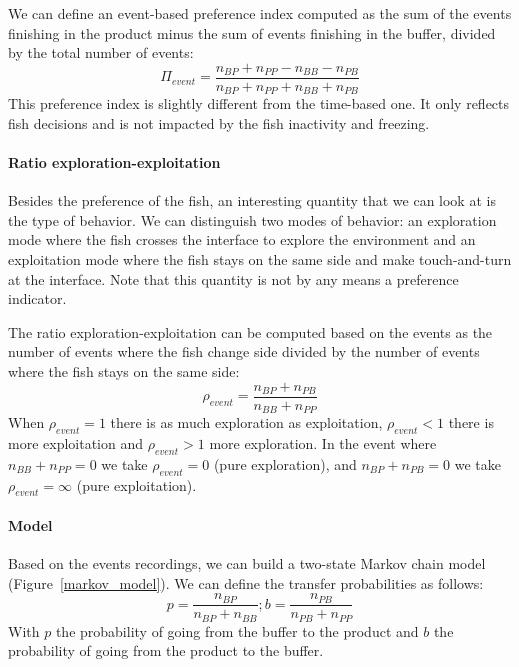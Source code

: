  We can define an event-based preference index computed as the sum of the events finishing in the product minus the sum of events finishing in the buffer, divided by the total number of events:
  \begin{equation}
    \Pi_{event} = \frac{n_{BP} + n_{PP} - n_{BB} - n_{PB}}{n_{BP} + n_{PP} + n_{BB} + n_{PB}}
  \end{equation}
  \noindent This preference index is slightly different from the time-based one. It only reflects fish decisions and is not impacted by the fish inactivity and freezing.

  \paragraph{Ratio exploration-exploitation} Besides the preference of the fish, an interesting quantity that we can look at is the type of behavior. We can distinguish two modes of behavior: an exploration mode where the fish crosses the interface to explore the environment and an exploitation mode where the fish stays on the same side and make touch-and-turn at the interface. Note that this quantity is not by any means a preference indicator.

  The ratio exploration-exploitation can be computed based on the events as the number of events where the fish change side divided by the number of events where the fish stays on the same side:
  \begin{equation}
    \rho_{event} = \frac{n_{BP} + n_{PB}}{n_{BB} + n_{PP}}
  \end{equation}
\noindent When $\rho_{event} = 1$ there is as much exploration as exploitation, $\rho_{event} < 1$ there is more exploitation and $\rho_{event} > 1$ more exploration. In the event where $n_{BB} + n_{PP} = 0$ we take $\rho_{event} = 0$ (pure exploration),  and $n_{BP} + n_{PB} = 0$ we take $\rho_{event} = \infty$ (pure exploitation).

  \paragraph{Model} Based on the events recordings, we can build a two-state Markov chain model (Figure~\ref{markov_model}). We can define the transfer probabilities as follows:
  \begin{equation}
    p = \frac{n_{BP}}{n_{BP} + n_{BB}} ;
    b = \frac{n_{PB}}{n_{PB} + n_{PP}}
  \end{equation}
  \noindent With $p$ the probability of going from the buffer to the product and $b$ the probability of going from the product to the buffer.

